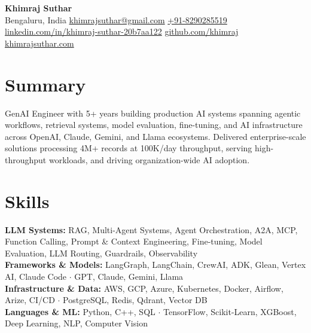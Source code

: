 \documentclass[a4paper,20pt]{article}
\begin{document}
\begin{center}
  \textbf{{\Large Khimraj Suthar}} \\
  Bengaluru, India \hspace{1em}
  \href{mailto:khimrajsuthar@gmail.com}{khimrajsuthar@gmail.com} \hspace{1em}
  \href{tel:+918290285519}{+91-8290285519} \\
  \href{https://www.linkedin.com/in/khimraj-suthar-20b7aa122/}{linkedin.com/in/khimraj-suthar-20b7aa122} \hspace{1em}
  \href{https://github.com/khimraj}{github.com/khimraj} \hspace{1em}
  \href{https://khimrajsuthar.com}{khimrajsuthar.com}
\end{center}

\section{Summary}
GenAI Engineer with 5+ years building production AI systems spanning agentic workflows, retrieval systems, model evaluation, fine-tuning, and AI infrastructure across OpenAI, Claude, Gemini, and Llama ecosystems. Delivered enterprise-scale solutions processing 4M+ records at 100K/day throughput, serving high-throughput workloads, and driving organization-wide AI adoption.

\vspace{1pt}
\section{Skills}
	\noindent\textbf{LLM Systems:} RAG, Multi-Agent Systems, Agent Orchestration, A2A, MCP, Function Calling, Prompt \& Context Engineering, Fine-tuning, Model Evaluation, LLM Routing, Guardrails, Observability \\
	\textbf{Frameworks \& Models:} LangGraph, LangChain, CrewAI, ADK, Glean, Vertex AI, Claude Code $\cdot$ GPT, Claude, Gemini, Llama \\
	\textbf{Infrastructure \& Data:} AWS, GCP, Azure, Kubernetes, Docker, Airflow, Arize, CI/CD $\cdot$ PostgreSQL, Redis, Qdrant, Vector DB \\
	\textbf{Languages \& ML:} Python, C++, SQL $\cdot$ TensorFlow, Scikit-Learn, XGBoost, Deep Learning, NLP, Computer Vision
 
\end{document}
